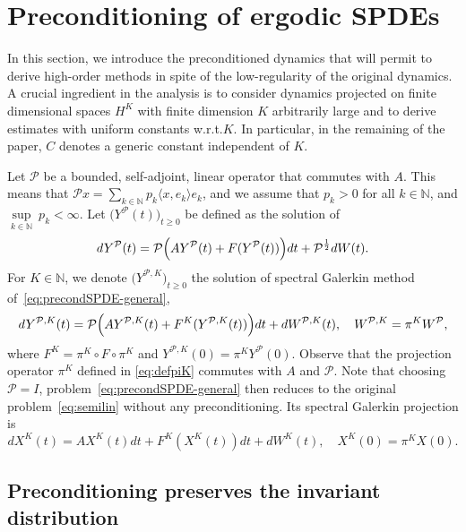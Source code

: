 \documentclass[11pt]{amsart}
\newcommand{\ts}{\thinspace}
\newcommand{\N}{\mathbb{N}}
\begin{document}
\section{Preconditioning of ergodic SPDEs}
\label{sec:precond}


In this section, we introduce the preconditioned dynamics that will permit to derive high-order methods in spite of the low-regularity of the original dynamics.
A crucial ingredient in the analysis is to consider dynamics projected on finite dimensional spaces $H^K$ with finite dimension $K$ arbitrarily large and to derive estimates with uniform constants w.r.t.\ts $K$. In particular, in the remaining of the paper, $C$ denotes a generic constant independent of $K$.

Let $\mathcal{P}$ be a bounded, self-adjoint, linear operator that commutes with $A$. This means that $\mathcal{P}x=\sum_{k\in\N}p_k\langle x,e_k\rangle e_k$, and we assume that $p_k>0$ for all $k\in\N$, and $\underset{k\in\N}\sup~p_k<\infty$. Let $\bigl(Y^{\mathcal{P}}(t)\bigr)_{t\ge 0}$ be defined as the solution of
\begin{equation}\label{eq:precondSPDE-general}
dY^{\mathcal{P}}(t)=\mathcal{P}\Bigl(AY^{\mathcal{P}}(t)+F(Y^{\mathcal{P}}(t))\Bigr)dt+\mathcal{P}^{\frac12}dW(t).
\end{equation}
For $K\in\N$, we denote $\bigl(Y^{\mathcal{P},K}\bigr)_{t\ge 0}$ the solution of
spectral Galerkin method of~\eqref{eq:precondSPDE-general},
\begin{equation}\label{eq:precondSPDE-general-Galerkin}
dY^{\mathcal{P},K}(t)=\mathcal{P}\Bigl(AY^{\mathcal{P},K}(t)+F^K(Y^{\mathcal{P},K}(t))\Bigr)dt+ dW^{\mathcal{P},K}(t), \quad W^{\mathcal{P},K}=\pi^K W^{\mathcal{P}},
\end{equation}
where $F^K=\pi^K \circ F \circ \pi^K$ and $Y^{\mathcal{P},K}(0)=\pi^K Y^{\mathcal{P}}(0)$. Observe that the projection operator $\pi^K$ defined in \eqref{eq:defpiK} commutes with $A$ and $\mathcal{P}$.
Note that choosing $\mathcal{P}=I$, problem~\eqref{eq:precondSPDE-general} then reduces to the original problem~\eqref{eq:semilin} without any preconditioning. Its spectral Galerkin projection is
\begin{equation}\label{eq:semilin_K}
dX^K(t)=AX^K(t)dt+F^K(X^K(t))dt+dW^K(t), \quad X^K(0)=\pi^K X(0).
\end{equation}








\subsection{Preconditioning preserves the invariant distribution}
\end{document}
